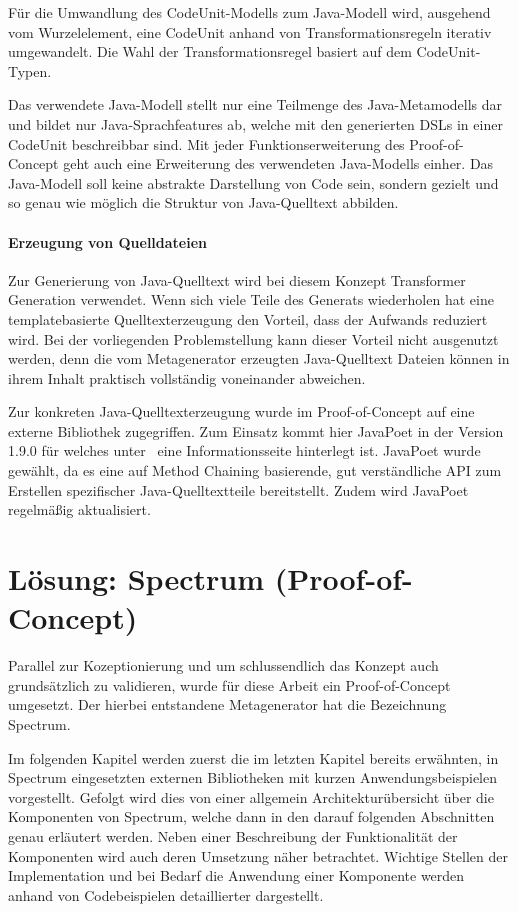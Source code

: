 \documentclass[12pt,oneside,a4paper,parskip]{scrbook}
\begin{document}
Für die Umwandlung des CodeUnit-Modells zum Java-Modell wird, ausgehend vom Wurzelelement, eine CodeUnit anhand von Transformationsregeln iterativ umgewandelt. Die Wahl der Transformationsregel basiert auf dem CodeUnit-Typen.

Das verwendete Java-Modell stellt nur eine Teilmenge des Java-Metamodells dar und bildet nur Java-Sprachfeatures ab, welche mit den generierten DSLs in einer CodeUnit beschreibbar sind. Mit jeder Funktionserweiterung des Proof-of-Concept geht auch eine Erweiterung des verwendeten Java-Modells einher. Das Java-Modell soll keine abstrakte Darstellung von Code sein, sondern gezielt und so genau wie möglich die Struktur von Java-Quelltext abbilden.

\subsubsection{Erzeugung von Quelldateien}\label{sec:javagen}

Zur Generierung von Java-Quelltext wird bei diesem Konzept Transformer Generation verwendet. Wenn sich viele Teile des Generats wiederholen hat eine templatebasierte Quelltexterzeugung den Vorteil, dass der Aufwands reduziert wird. Bei der vorliegenden Problemstellung kann dieser Vorteil nicht ausgenutzt werden, denn die vom Metagenerator erzeugten Java-Quelltext Dateien können in ihrem Inhalt praktisch vollständig voneinander abweichen.

Zur konkreten Java-Quelltexterzeugung wurde im Proof-of-Concept auf eine externe Bibliothek zugegriffen. Zum Einsatz kommt hier JavaPoet in der Version 1.9.0 für welches unter~\cite{javapoet2017} eine Informationsseite hinterlegt ist. JavaPoet wurde gewählt, da es eine auf Method Chaining basierende, gut verständliche API zum Erstellen spezifischer Java-Quelltextteile bereitstellt. Zudem wird JavaPoet regelmäßig aktualisiert.

\chapter{Lösung: Spectrum (Proof-of-Concept)}

Parallel zur Kozeptionierung und um schlussendlich das Konzept auch grundsätzlich zu validieren, wurde für diese Arbeit ein Proof-of-Concept umgesetzt. Der hierbei entstandene Metagenerator hat die Bezeichnung Spectrum.

Im folgenden Kapitel werden zuerst die im letzten Kapitel bereits erwähnten, in Spectrum eingesetzten externen Bibliotheken mit kurzen Anwendungsbeispielen vorgestellt. Gefolgt wird dies von einer allgemein Architekturübersicht über die Komponenten von Spectrum, welche dann in den darauf folgenden Abschnitten genau erläutert werden. Neben einer Beschreibung der Funktionalität der Komponenten wird auch deren Umsetzung näher betrachtet. Wichtige Stellen der Implementation und bei Bedarf die Anwendung einer Komponente werden anhand von Codebeispielen detaillierter dargestellt.
\end{document}
